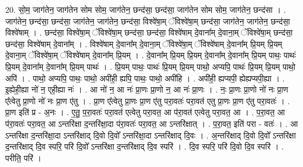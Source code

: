 \documentclass[17pt]{extarticle}
\begin{document}
20. सो॒म॒ जाग॑तेन॒ जाग॑तेन सोम सोम॒ जाग॑तेन॒ छन्द॑सा॒ छन्द॑सा॒ जाग॑तेन सोम सोम॒ जाग॑तेन॒ छन्द॑सा । . जाग॑तेन॒ छन्द॑सा॒ छन्द॑सा॒ जाग॑तेन॒ जाग॑तेन॒ छन्द॑सा॒ विश्वे॑षा॒म् ॅविश्वे॑षा॒म् छन्द॑सा॒ जाग॑तेन॒ जाग॑तेन॒ छन्द॑सा॒ विश्वे॑षाम् । . छन्द॑सा॒ विश्वे॑षा॒म् ॅविश्वे॑षा॒म् छन्द॑सा॒ छन्द॑सा॒ विश्वे॑षाम् दे॒वाना᳚म् दे॒वाना॒म् ॅविश्वे॑षा॒म् छन्द॑सा॒ छन्द॑सा॒ विश्वे॑षाम् दे॒वाना᳚म् । . विश्वे॑षाम् दे॒वाना᳚म् दे॒वाना॒म् ॅविश्वे॑षा॒म् ॅविश्वे॑षाम् दे॒वाना᳚म् प्रि॒यम् प्रि॒यम् दे॒वाना॒म् ॅविश्वे॑षा॒म् ॅविश्वे॑षाम् दे॒वाना᳚म् प्रि॒यम् । . दे॒वाना᳚म् प्रि॒यम् प्रि॒यम् दे॒वाना᳚म् दे॒वाना᳚म् प्रि॒यम् पाथः॒ पाथः॑ प्रि॒यम् दे॒वाना᳚म् दे॒वाना᳚म् प्रि॒यम् पाथः॑ । . प्रि॒यम् पाथः॒ पाथः॑ प्रि॒यम् प्रि॒यम् पाथो॒ अप्यपि॒ पाथः॑ प्रि॒यम् प्रि॒यम् पाथो॒ अपि॑ । . पाथो॒ अप्यपि॒ पाथः॒ पाथो॒ अपी॑ही॒ ह्यपि॒ पाथः॒ पाथो॒ अपी॑हि । . अपी॑ही॒ ह्यप्यपी॒ ह्येह्यप्यपी॒ह्या । . इ॒ह्येही॒ह्या नो॑ न॒ एही॒ह्या नः॑ । . आ नो॑ न॒ आ नः॑ प्रा॒णः प्रा॒णो न॒ आ नः॑ प्रा॒णः । . नः॒ प्रा॒णः प्रा॒णो नो॑ नः प्रा॒ण ए᳚त्वेतु प्रा॒णो नो॑ नः प्रा॒ण ए॑तु । . प्रा॒ण ए᳚त्वेतु प्रा॒णः प्रा॒ण ए॑तु परा॒वतः॑ परा॒वत॑ एतु प्रा॒णः प्रा॒ण ए॑तु परा॒वतः॑ । . प्रा॒ण इति॑ प्र - अ॒नः । . ए॒तु॒ प॒रा॒वतः॑ परा॒वत॑ एत्वेतु परा॒वत॒ आ प॑रा॒वत॑ एत्वेतु परा॒वत॒ आ । . प॒रा॒वत॒ आ प॑रा॒वतः॑ परा॒वत॒ आ ऽन्तरि॑क्षा द॒न्तरि॑क्षा॒दा प॑रा॒वतः॑ परा॒वत॒ आ ऽन्तरि॑क्षात् । . प॒रा॒वत॒ इति॑ परा - वतः॑ । . आ ऽन्तरि॑क्षा द॒न्तरि॑क्षा॒दा ऽन्तरि॑क्षाद् दि॒वो दि॒वो᳚ ऽन्तरि॑क्षा॒दा ऽन्तरि॑क्षाद् दि॒वः । . अ॒न्तरि॑क्षाद् दि॒वो दि॒वो᳚ ऽन्तरि॑क्षा द॒न्तरि॑क्षाद् दि॒व स्परि॒ परि॑ दि॒वो᳚ ऽन्तरि॑क्षा द॒न्तरि॑क्षाद् दि॒व स्परि॑ । . दि॒व स्परि॒ परि॑ दि॒वो दि॒व स्परि॑ । . परीति॒ परि॑ । \newline
\end{document}
